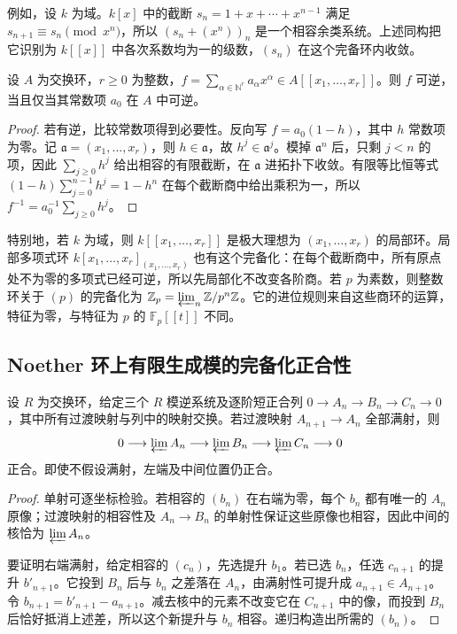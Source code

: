 例如，设 \(k\) 为域。\(k[x]\) 中的截断 \(s_n=1+x+\cdots+x^{n-1}\) 满足 \(s_{n+1}\equiv s_n\pmod{x^n}\)，所以 \((s_n+(x^n))_n\) 是一个相容余类系统。上述同构把它识别为 \(k[\![x]\!]\) 中各次系数均为一的级数，\((s_n)\) 在这个完备环内收敛。

\begin{proposition}\label{b3:prop:formal-series-unit}
	设 \(A\) 为交换环，\(r\ge0\) 为整数，\(f=\sum_{\alpha\in\mathbb N^r}a_\alpha x^\alpha\in A[\![x_1,\ldots,x_r]\!]\)。则 \(f\) 可逆，当且仅当其常数项 \(a_0\) 在 \(A\) 中可逆。
\end{proposition}
\begin{proof}
	若有逆，比较常数项得到必要性。反向写 \(f=a_0(1-h)\)，其中 \(h\) 常数项为零。记 \(\mathfrak a=(x_1,\ldots,x_r)\)，则 \(h\in\mathfrak a\)，故 \(h^j\in\mathfrak a^j\)。模掉 \(\mathfrak a^n\) 后，只剩 \(j<n\) 的项，因此 \(\sum_{j\ge0}h^j\) 给出相容的有限截断，在 \(\mathfrak a\) 进拓扑下收敛。有限等比恒等式 \((1-h)\sum_{j=0}^{n-1}h^j=1-h^n\) 在每个截断商中给出乘积为一，所以 \(f^{-1}=a_0^{-1}\sum_{j\ge0}h^j\)。
\end{proof}

特别地，若 \(k\) 为域，则 \(k[\![x_1,\ldots,x_r]\!]\) 是极大理想为 \((x_1,\ldots,x_r)\) 的局部环。局部多项式环 \(k[x_1,\ldots,x_r]_{(x_1,\ldots,x_r)}\) 也有这个完备化：在每个截断商中，所有原点处不为零的多项式已经可逆，所以先局部化不改变各阶商。若 \(p\) 为素数，则整数环关于 \((p)\) 的完备化为 \(\mathbb Z_p=\varprojlim_n\mathbb Z/p^n\mathbb Z\)。它的进位规则来自这些商环的运算，特征为零，与特征为 \(p\) 的 \(\mathbb F_p[\![t]\!]\) 不同。

\subsection{Noether 环上有限生成模的完备化正合性}
\label{b3:subsec:1303:03}

\begin{lemma}\label{b3:lem:inverse-limit-exact-surjective-kernels}
	设 \(R\) 为交换环，给定三个 \(R\) 模逆系统及逐阶短正合列 \(0\rightarrow A_n\rightarrow B_n\rightarrow C_n\rightarrow0\)，其中所有过渡映射与列中的映射交换。若过渡映射 \(A_{n+1}\rightarrow A_n\) 全部满射，则
	\[
		0\longrightarrow\varprojlim A_n\longrightarrow\varprojlim B_n \longrightarrow\varprojlim C_n\longrightarrow0
	\]
	正合。即使不假设满射，左端及中间位置仍正合。
\end{lemma}
\begin{proof}
	单射可逐坐标检验。若相容的 \((b_n)\) 在右端为零，每个 \(b_n\) 都有唯一的 \(A_n\) 原像；过渡映射的相容性及 \(A_n\to B_n\) 的单射性保证这些原像也相容，因此中间的核恰为 \(\varprojlim A_n\)。

	要证明右端满射，给定相容的 \((c_n)\)，先选提升 \(b_1\)。若已选 \(b_n\)，任选 \(c_{n+1}\) 的提升 \(b'_{n+1}\)。它投到 \(B_n\) 后与 \(b_n\) 之差落在 \(A_n\)，由满射性可提升成 \(a_{n+1}\in A_{n+1}\)。令 \(b_{n+1}=b'_{n+1}-a_{n+1}\)。减去核中的元素不改变它在 \(C_{n+1}\) 中的像，而投到 \(B_n\) 后恰好抵消上述差，所以这个新提升与 \(b_n\) 相容。递归构造出所需的 \((b_n)\)。
\end{proof}

